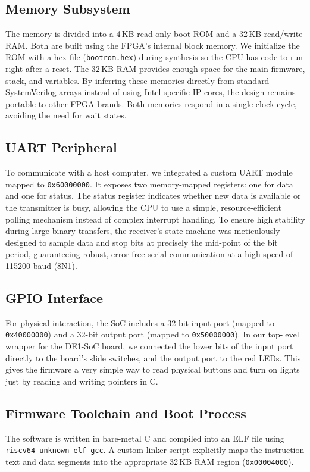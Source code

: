 \documentclass[runningheads]{llncs}
\begin{document}
\subsection{Memory Subsystem}
The memory is divided into a 4\,KB read-only boot ROM and a 32\,KB read/write RAM. Both are built using the FPGA's internal block memory. We initialize the ROM with a hex file (\texttt{bootrom.hex}) during synthesis so the CPU has code to run right after a reset. The 32\,KB RAM provides enough space for the main firmware, stack, and variables. By inferring these memories directly from standard SystemVerilog arrays instead of using Intel-specific IP cores, the design remains portable to other FPGA brands. Both memories respond in a single clock cycle, avoiding the need for wait states.

\subsection{UART Peripheral}
To communicate with a host computer, we integrated a custom UART module mapped to \texttt{0x60000000}. It exposes two memory-mapped registers: one for data and one for status. The status register indicates whether new data is available or the transmitter is busy, allowing the CPU to use a simple, resource-efficient polling mechanism instead of complex interrupt handling. To ensure high stability during large binary transfers, the receiver's state machine was meticulously designed to sample data and stop bits at precisely the mid-point of the bit period, guaranteeing robust, error-free serial communication at a high speed of 115200 baud (8N1).

\subsection{GPIO Interface}
For physical interaction, the SoC includes a 32-bit input port (mapped to  \texttt{0x40000000}) and a 32-bit output port (mapped to \texttt{0x50000000}). In our top-level wrapper for the DE1-SoC board, we connected the lower bits of the input port directly to the board's slide switches, and the output port to the red LEDs. This gives the firmware a very simple way to read physical buttons and turn on lights just by reading and writing pointers in C.
\subsection{Firmware Toolchain and Boot Process}
The software is written in bare-metal C and compiled into an ELF file using \texttt{riscv64-unknown-elf-gcc}. A custom linker script explicitly maps the instruction text and data segments into the appropriate 32\,KB RAM region (\texttt{0x00004000}).
\end{document}
